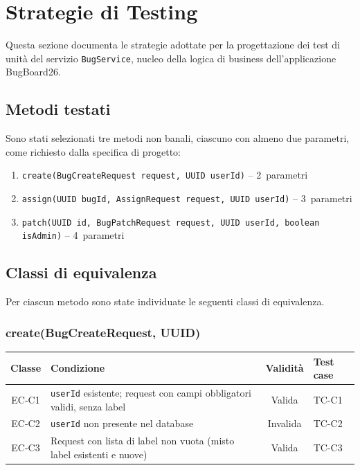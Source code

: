 
\section{Strategie di Testing}

Questa sezione documenta le strategie adottate per la progettazione dei
test di unità del servizio \texttt{BugService}, nucleo della logica di
business dell'applicazione BugBoard26.

\subsection{Metodi testati}

Sono stati selezionati tre metodi non banali, ciascuno con almeno due
parametri, come richiesto dalla specifica di progetto:

\begin{enumerate}
    \item \texttt{create(BugCreateRequest request, UUID userId)} – 2~parametri
    \item \texttt{assign(UUID bugId, AssignRequest request, UUID userId)} – 3~parametri
    \item \texttt{patch(UUID id, BugPatchRequest request, UUID userId, boolean isAdmin)} – 4~parametri
\end{enumerate}

\subsection{Classi di equivalenza}

Per ciascun metodo sono state individuate le seguenti classi di equivalenza.

\subsubsection{create(BugCreateRequest, UUID)}

\begin{center}
\small
\begin{tabular}{|c|p{5.5cm}|c|p{4.5cm}|}
\hline
\textbf{Classe} & \textbf{Condizione} & \textbf{Validità} & \textbf{Test case} \\
\hline
EC-C1 & \texttt{userId} esistente; request con campi obbligatori validi, senza label & Valida & TC-C1 \\
\hline
EC-C2 & \texttt{userId} non presente nel database & Invalida & TC-C2 \\
\hline
EC-C3 & Request con lista di label non vuota (misto label esistenti e nuove) & Valida & TC-C3 \\
\hline
\end{tabular}
\end{center}

